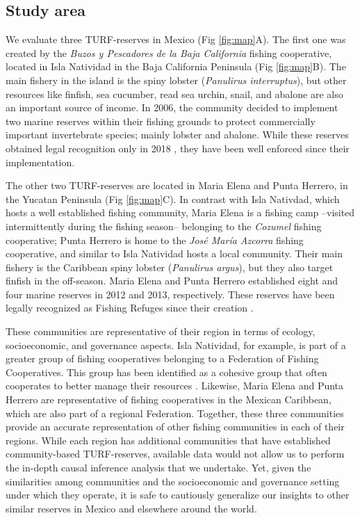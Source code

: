 \documentclass{frontiersSCNS}
\begin{document}
\hypertarget{study-area}{%
\subsection{Study area}\label{study-area}}

We evaluate three TURF-reserves in Mexico (Fig \ref{fig:map}A). The
first one was created by the \emph{Buzos y Pescadores de la Baja
California} fishing cooperative, located in Isla Natividad in the Baja
California Peninsula (Fig \ref{fig:map}B). The main fishery in the
island is the spiny lobster (\emph{Panulirus interruptus}), but other
resources like finfish, sea cucumber, read sea urchin, snail, and
abalone are also an important source of income. In 2006, the community
decided to implement two marine reserves within their fishing grounds to
protect commercially important invertebrate species; mainly lobster and
abalone. While these reserves obtained legal recognition only in 2018
\citep{dof_website_2018}, they have been well enforced since their
implementation.

The other two TURF-reserves are located in Maria Elena and Punta
Herrero, in the Yucatan Peninsula (Fig \ref{fig:map}C). In contrast with
Isla Nativdad, which hosts a well established fishing community, Maria
Elena is a fishing camp --visited intermittently during the fishing
season-- belonging to the \emph{Cozumel} fishing cooperative; Punta
Herrero is home to the \emph{José María Azcorra} fishing cooperative,
and similar to Isla Natividad hosts a local community. Their main
fishery is the Caribbean spiny lobster (\emph{Panulirus argus}), but
they also target finfish in the off-season. Maria Elena and Punta
Herrero established eight and four marine reserves in 2012 and 2013,
respectively. These reserves have been legally recognized as Fishing
Refuges since their creation \citep{dof_website_2012,dof_website_2013}.

These communities are representative of their region in terms of
ecology, socioeconomic, and governance aspects. Isla Natividad, for
example, is part of a greater group of fishing cooperatives belonging to
a Federation of Fishing Cooperatives. This group has been identified as
a cohesive group that often cooperates to better manage their resources
\citep{mccay_2014-CN,mccay_2017-1m,acevesbueno_2017}. Likewise, Maria
Elena and Punta Herrero are representative of fishing cooperatives in
the Mexican Caribbean, which are also part of a regional Federation.
Together, these three communities provide an accurate representation of
other fishing communities in each of their regions. While each region
has additional communities that have established community-based
TURF-reserves, available data would not allow us to perform the in-depth
causal inference analysis that we undertake. Yet, given the similarities
among communities and the socioeconomic and governance setting under
which they operate, it is safe to cautiously generalize our insights to
other similar reserves in Mexico and elsewhere around the world.
\end{document}
